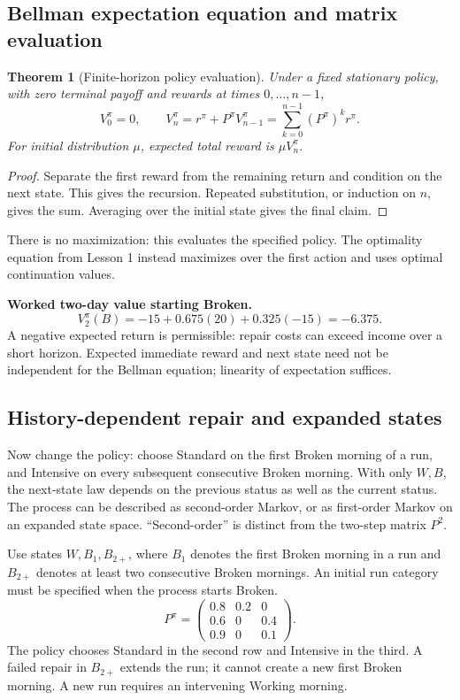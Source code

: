 \documentclass[11pt]{article}
\newtheorem{theorem}[definition]{Theorem}
\theoremstyle{remark}\newtheorem{remark}[definition]{Remark}
\begin{document}
\subsection{Bellman expectation equation and matrix evaluation}
\begin{theorem}[Finite-horizon policy evaluation]
Under a fixed stationary policy, with zero terminal payoff and rewards at times $0,\ldots,n-1$,
\[
V_0^\pi=0,\qquad
V_n^\pi=r^\pi+P^\pi V_{n-1}^\pi
=\sum_{k=0}^{n-1}(P^\pi)^kr^\pi.
\]
For initial distribution $\mu$, expected total reward is $\mu V_n^\pi$.
\end{theorem}
\begin{proof}
Separate the first reward from the remaining return and condition on the next state. This gives the recursion. Repeated substitution, or induction on $n$, gives the sum. Averaging over the initial state gives the final claim.
\end{proof}
There is no maximization: this evaluates the specified policy. The optimality equation from Lesson 1 instead maximizes over the first action and uses optimal continuation values.

\textbf{Worked two-day value starting Broken.}
\[
V_2^\pi(B)=-15+0.675(20)+0.325(-15)=-6.375.
\]
A negative expected return is permissible: repair costs can exceed income over a short horizon. Expected immediate reward and next state need not be independent for the Bellman equation; linearity of expectation suffices.

\clearpage
\subsection{History-dependent repair and expanded states}
Now change the policy: choose Standard on the first Broken morning of a run, and Intensive on every subsequent consecutive Broken morning. With only $W,B$, the next-state law depends on the previous status as well as the current status. The process can be described as second-order Markov, or as first-order Markov on an expanded state space. ``Second-order'' is distinct from the two-step matrix $P^2$.

Use states $W,B_1,B_{2+}$, where $B_1$ denotes the first Broken morning in a run and $B_{2+}$ denotes at least two consecutive Broken mornings. An initial run category must be specified when the process starts Broken.
\[
P^\pi=\begin{pmatrix}
0.8&0.2&0\\
0.6&0&0.4\\
0.9&0&0.1
\end{pmatrix}.
\]
The policy chooses Standard in the second row and Intensive in the third. A failed repair in $B_{2+}$ extends the run; it cannot create a new first Broken morning. A new run requires an intervening Working morning.
\end{document}
